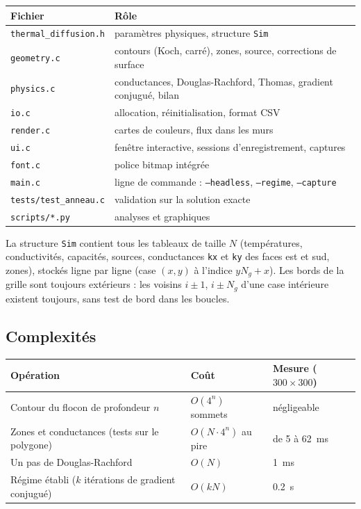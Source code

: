 \documentclass[11pt,a4paper]{article}
\theoremstyle{definition}
\theoremstyle{remark}
\begin{document}
\begin{center}
\begin{tabular}{ll}
\toprule
Fichier & Rôle\\
\midrule
\texttt{thermal\_diffusion.h} & paramètres physiques, structure \texttt{Sim}\\
\texttt{geometry.c} & contours (Koch, carré), zones, source, corrections de surface\\
\texttt{physics.c} & conductances, Douglas-Rachford, Thomas, gradient conjugué, bilan\\
\texttt{io.c} & allocation, réinitialisation, format CSV\\
\texttt{render.c} & cartes de couleurs, flux dans les murs\\
\texttt{ui.c} & fenêtre interactive, sessions d'enregistrement, captures\\
\texttt{font.c} & police bitmap intégrée\\
\texttt{main.c} & ligne de commande : \texttt{--headless}, \texttt{--regime}, \texttt{--capture}\\
\texttt{tests/test\_anneau.c} & validation sur la solution exacte\\
\texttt{scripts/*.py} & analyses et graphiques\\
\bottomrule
\end{tabular}
\end{center}

La structure \texttt{Sim} contient tous les tableaux de taille $N$ (températures,
conductivités, capacités, sources, conductances \texttt{kx} et \texttt{ky} des faces
est et sud, zones), stockés ligne par ligne (case $(x,y)$ à l'indice $yN_g+x$). Les
bords de la grille sont toujours extérieurs : les voisins $i\pm1$, $i\pm N_g$ d'une
case intérieure existent toujours, sans test de bord dans les boucles.

\subsection{Complexités}

\begin{center}
\begin{tabular}{lll}
\toprule
Opération & Coût & Mesure ($300\times300$)\\
\midrule
Contour du flocon de profondeur $n$ & $O(4^n)$ sommets & négligeable\\
Zones et conductances (tests sur le polygone) & $O(N\cdot 4^n)$ au pire & de 5 à \qty{62}{\milli\second}\\
Un pas de Douglas-Rachford & $O(N)$ & \qty{1}{\milli\second}\\
Régime établi ($k$ itérations de gradient conjugué) & $O(kN)$ & \qty{0,2}{\second}\\
\bottomrule
\end{tabular}
\end{center}
\end{document}
